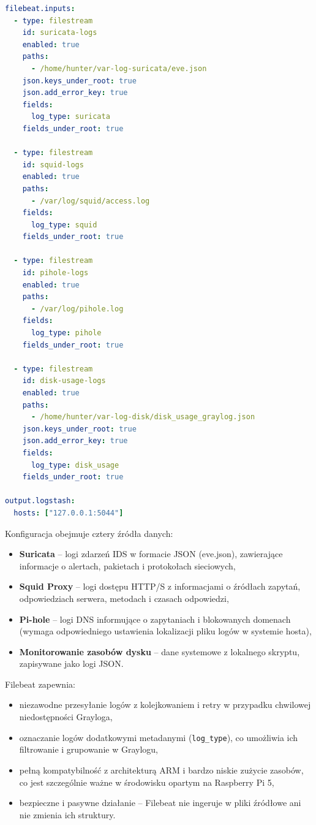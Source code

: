 \documentclass[
    left=2.5cm,         %
    right=2.5cm,        %
    top=2.5cm,          %
    bottom=3cm,         %
    bindingoffset=6mm,  %
    nohyphenation=true %
]{eiti/eiti-thesis} %
\begin{document}
\begin{lstlisting}[language=yaml, caption={Przykładowa konfiguracja Filebeat (filebeat.yml)}, label={lst:filebeat-config}]
filebeat.inputs:
  - type: filestream
    id: suricata-logs
    enabled: true
    paths:
      - /home/hunter/var-log-suricata/eve.json
    json.keys_under_root: true
    json.add_error_key: true
    fields:
      log_type: suricata
    fields_under_root: true

  - type: filestream
    id: squid-logs
    enabled: true
    paths:
      - /var/log/squid/access.log
    fields:
      log_type: squid
    fields_under_root: true

  - type: filestream
    id: pihole-logs
    enabled: true
    paths:
      - /var/log/pihole.log
    fields:
      log_type: pihole
    fields_under_root: true

  - type: filestream
    id: disk-usage-logs
    enabled: true
    paths:
      - /home/hunter/var-log-disk/disk_usage_graylog.json
    json.keys_under_root: true
    json.add_error_key: true
    fields:
      log_type: disk_usage
    fields_under_root: true

output.logstash:
  hosts: ["127.0.0.1:5044"]
\end{lstlisting}

Konfiguracja obejmuje cztery źródła danych:
\begin{itemize}
    \item \textbf{Suricata} – logi zdarzeń IDS w formacie JSON (eve.json), zawierające informacje o alertach, pakietach i protokołach sieciowych,
    \item \textbf{Squid Proxy} – logi dostępu HTTP/S z informacjami o źródłach zapytań, odpowiedziach serwera, metodach i czasach odpowiedzi,
    \item \textbf{Pi-hole} – logi DNS informujące o zapytaniach i blokowanych domenach (wymaga odpowiedniego ustawienia lokalizacji pliku logów w systemie hosta),
    \item \textbf{Monitorowanie zasobów dysku} – dane systemowe z lokalnego skryptu, zapisywane jako logi JSON.
\end{itemize}

Filebeat zapewnia:
\begin{itemize}
    \item niezawodne przesyłanie logów z kolejkowaniem i retry w przypadku chwilowej niedostępności Grayloga,
    \item oznaczanie logów dodatkowymi metadanymi (\texttt{log\_type}), co umożliwia ich filtrowanie i grupowanie w Graylogu,
    \item pełną kompatybilność z architekturą ARM i bardzo niskie zużycie zasobów, co jest szczególnie ważne w środowisku opartym na Raspberry Pi 5,
    \item bezpieczne i pasywne działanie – Filebeat nie ingeruje w pliki źródłowe ani nie zmienia ich struktury.
\end{itemize}
\end{document}
